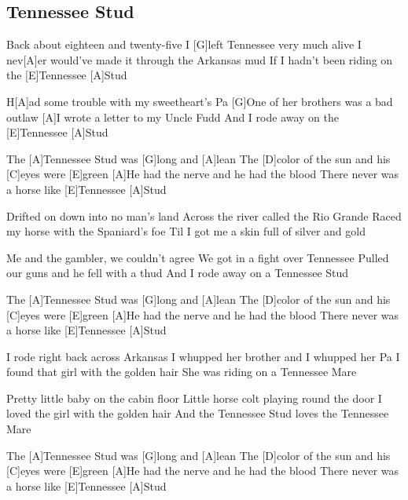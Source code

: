 \subsection*{Tennessee Stud   }
\begin{guitar}
[A]Back about eighteen and twenty-five
I [G]left Tennessee very much alive
I nev[A]er would've made it through the Arkansas mud
If I hadn't been riding on the [E]Tennessee [A]Stud



H[A]ad some trouble with my sweetheart's Pa
[G]One of her brothers was a bad outlaw
[A]I wrote a letter to my Uncle Fudd
And I rode away on the [E]Tennessee [A]Stud



The [A]Tennessee Stud was [G]long and [A]lean
The [D]color of the sun and his [C]eyes were [E]green
[A]He had the nerve and he had the blood
There never was a horse like [E]Tennessee [A]Stud



Drifted on down into no man's land
Across the river called the Rio Grande
Raced my horse with the Spaniard's foe
Til I got me a skin full of silver and gold



Me and the gambler, we couldn't agree
We got in a fight over Tennessee
Pulled our guns and he fell with a thud
And I rode away on a Tennessee Stud



The [A]Tennessee Stud was [G]long and [A]lean
The [D]color of the sun and his [C]eyes were [E]green
[A]He had the nerve and he had the blood
There never was a horse like [E]Tennessee [A]Stud



I rode right back across Arkansas
I whupped her brother and I whupped her Pa
I found that girl with the golden hair
She was riding on a Tennessee Mare



Pretty little baby on the cabin floor
Little horse colt playing round the door
I loved the girl with the golden hair
And the Tennessee Stud loves the Tennessee Mare



The [A]Tennessee Stud was [G]long and [A]lean
The [D]color of the sun and his [C]eyes were [E]green
[A]He had the nerve and he had the blood
There never was a horse like [E]Tennessee [A]Stud
\end{guitar}
